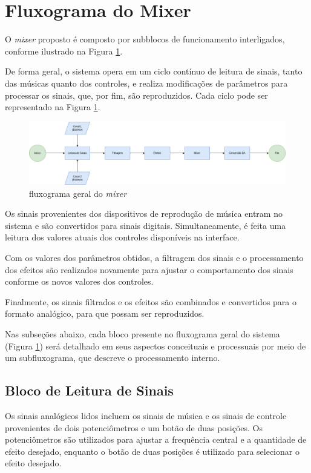 \section{Fluxograma do Mixer}

O \textit{mixer} proposto é composto por subblocos de funcionamento interligados, conforme ilustrado na Figura \ref{fig52}.

De forma geral, o sistema opera em um ciclo contínuo de leitura de sinais, tanto das músicas quanto dos controles, e realiza modificações de parâmetros para processar os sinais, que, por fim, são reproduzidos. Cada ciclo pode ser representado na Figura \ref{fig52}.

\begin{figure}[h]
    \centering
    \includegraphics[width=\textwidth]{figuras/fig52.png}
    \caption{fluxograma geral do \textit{mixer}}
    \label{fig52}
\end{figure}

Os sinais provenientes dos dispositivos de reprodução de música entram no sistema e são convertidos para sinais digitais. Simultaneamente, é feita uma leitura dos valores atuais dos controles disponíveis na interface.

Com os valores dos parâmetros obtidos, a filtragem dos sinais e o processamento dos efeitos são realizados novamente para ajustar o comportamento dos sinais conforme os novos valores dos controles.

Finalmente, os sinais filtrados e os efeitos são combinados e convertidos para o formato analógico, para que possam ser reproduzidos.

Nas subseções abaixo, cada bloco presente no fluxograma geral do sistema (Figura \ref{fig52}) será detalhado em seus aspectos conceituais e processuais por meio de um subfluxograma, que descreve o processamento interno.

\subsection{Bloco de Leitura de Sinais}

Os sinais analógicos lidos incluem os sinais de música e os sinais de controle provenientes de dois potenciômetros e um botão de duas posições. Os potenciômetros são utilizados para ajustar a frequência central e a quantidade de efeito desejado, enquanto o botão de duas posições é utilizado para selecionar o efeito desejado.

